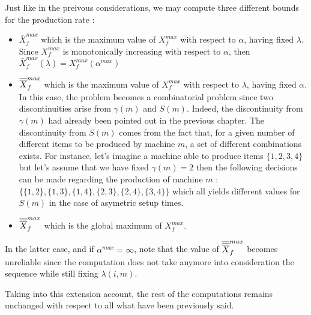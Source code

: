 Just like in the preivous considerations, we may compute three different bounds for the production rate : 
\begin{itemize}
    \item $\bar X_f^{max}$ which is the maximum value of $X_f^{max}$ with respect to $\alpha$, having fixed $\lambda$. Since $X_f^{max}$ is monotonically increasing with respect to $\alpha$, then $\bar X_f^{max}(\underline \lambda) = X_f^{max}(\alpha^{max})$
    \item $\overline{\overline{X}}_f^{max}$ which is the maximum value of $X_f^{max}$ with respect to $\lambda$, having fixed $\alpha$. In this case, the problem becomes a combinatorial problem since two discontinuities arise from $\gamma(m)$ and $S(m)$. Indeed, the discontinuity from $\gamma(m)$ had already been pointed out in the previous chapter. The discontinuity from $S(m)$ comes from the fact that, for a given number of different items to be produced by machine $m$, a set of different combinations exists. For instance, let's imagine a machine able to produce items $\{ 1, 2, 3, 4 \}$ but let's assume that we have fixed $\gamma(m) = 2$ then the following decisions can be made regarding the production of machine $m$ : $\{ \{ 1, 2 \}, \{ 1, 3 \}, \{ 1, 4 \}, \{ 2, 3 \}, \{ 2, 4 \},  \{ 3, 4 \} \}$ which all yields different values for $S(m)$ in the case of asymetric setup times. 
    \item $\overline{\overline{\overline{X}}}_f^{max}$ which is the global maximum of $X_f^{max}$.
\end{itemize}

In the latter case, and if $\alpha^{max} = \infty$, note that the value of $\overline{\overline{\overline{X}}}_f^{max}$ becomes unreliable since the computation does not take anymore into consideration the sequence while still fixing $\lambda(i,m)$. 

Taking into this extension account, the rest of the computations remains unchanged with respect to all what have been previously said. 
